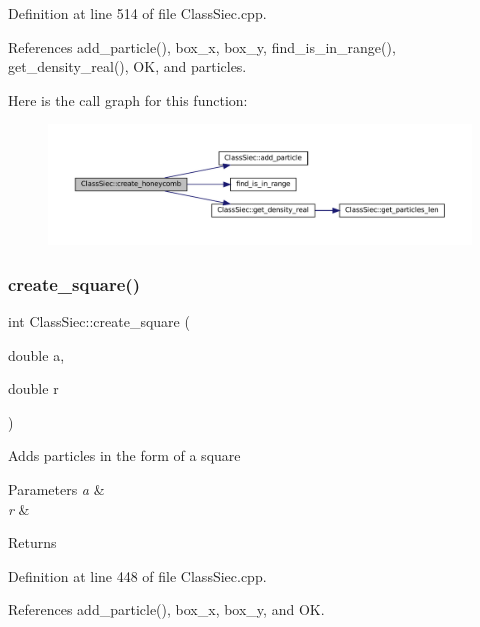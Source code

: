 Definition at line 514 of file Class\+Siec.\+cpp.



References add\+\_\+particle(), box\+\_\+x, box\+\_\+y, find\+\_\+is\+\_\+in\+\_\+range(), get\+\_\+density\+\_\+real(), OK, and particles.

Here is the call graph for this function\+:
\nopagebreak
\begin{figure}[H]
\begin{center}
\leavevmode
\includegraphics[width=350pt]{classClassSiec_a293f258a3a45122d0d59bd6b827f0442_cgraph}
\end{center}
\end{figure}
\mbox{\label{classClassSiec_a4b34a96c2302a69832378955e515349c}} 
\subsubsection{\texorpdfstring{create\+\_\+square()}{create\_square()}}
{\footnotesize\ttfamily int Class\+Siec\+::create\+\_\+square (\begin{DoxyParamCaption}\item[{double}]{a,  }\item[{double}]{r }\end{DoxyParamCaption})}

Adds particles in the form of a square 
\begin{DoxyParams}{Parameters}
{\em a} & \\
\hline
{\em r} & \\
\hline
\end{DoxyParams}
\begin{DoxyReturn}{Returns}

\end{DoxyReturn}


Definition at line 448 of file Class\+Siec.\+cpp.



References add\+\_\+particle(), box\+\_\+x, box\+\_\+y, and OK.

